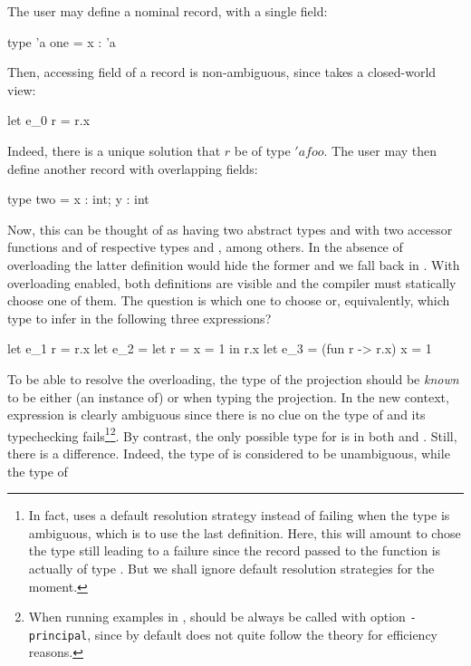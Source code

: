 \documentclass[acmsmall,screen,nonacm]{acmart}
\begin{document}
The user may define a nominal record, with \eg a single field:
\begin{program}[input]
type 'a one = {x : 'a}
\end{program}
Then, accessing field  of a record is non-ambiguous, since
\OCaml takes a closed-world view:
\begin{program}[input]
let e_0 r = r.x
\end{program}
Indeed, there is a unique solution that \ocaml$r$ be of type \ocaml$'a foo$. 
The user may then define another record with overlapping fields:
\begin{program}[input]
type two = {x : int; y : int}
\end{program}
Now, this can be thought of as having two abstract types  and
 with two accessor functions  and
 of respective types  and
, among others.
%
In the absence of overloading the latter definition would hide the former
and we fall back in \ML.  With overloading enabled, both definitions are
visible and the compiler must statically choose one of them.
%
The question is which one to choose or, equivalently, which type to infer
in the following three expressions?
\begin{program}[input]
let e_1 r = r.x
let e_2 = let r = {x = 1} in r.x
let e_3 = (fun r -> r.x) {x = 1}
\end{program}
To be able to resolve the overloading, the type of the projection should be
\emph{known} to be either (an instance of)  or 
when typing the projection.  In the new context, expression 
 is clearly ambiguous since there is no clue on the type
of  and its typechecking fails\footnote {In fact, \OCaml uses a
default resolution strategy instead of failing when the type is ambiguous,
which is to use the last definition. Here, this will amount to chose the
type  still leading to a failure since the record passed to the
function is actually of type . But we shall ignore default
resolution strategies for the moment.}\footnote {When running examples in
\OCaml,
\OCaml should be always be called with option \texttt{-principal}, since by
default \OCaml does not quite follow the theory for efficiency reasons.}.
%
By contrast, the only possible type for  is  in both
 and .  Still, there is a difference.  Indeed, the
type of  is considered to be unambiguous, while the type of
\end{document}
